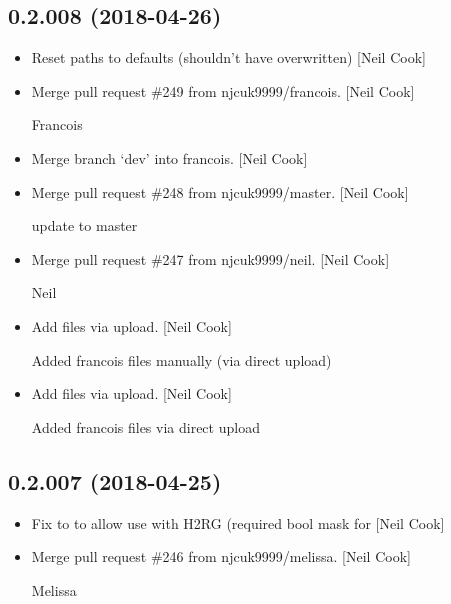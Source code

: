 \documentclass[a4paper,10pt,english]{report}
\begin{document}
\subsection{0.2.008 (2018-04-26)}
\label{\detokenize{misc/changelog:id453}}\begin{itemize}
\item {} 
Reset paths to defaults (shouldn’t have overwritten) {[}Neil Cook{]}

\item {} 
Merge pull request \#249 from njcuk9999/francois. {[}Neil Cook{]}

Francois

\item {} 
Merge branch ‘dev’ into francois. {[}Neil Cook{]}

\item {} 
Merge pull request \#248 from njcuk9999/master. {[}Neil Cook{]}

update to master

\item {} 
Merge pull request \#247 from njcuk9999/neil. {[}Neil Cook{]}

Neil

\item {} 
Add files via upload. {[}Neil Cook{]}

Added francois files manually (via direct upload)

\item {} 
Add files via upload. {[}Neil Cook{]}

Added francois files via direct upload

\end{itemize}


\subsection{0.2.007 (2018-04-25)}
\label{\detokenize{misc/changelog:id454}}\begin{itemize}
\item {} 
Fix to  to allow use with H2RG (required bool mask for
 {[}Neil Cook{]}

\item {} 
Merge pull request \#246 from njcuk9999/melissa. {[}Neil Cook{]}

Melissa

\end{itemize}
\end{document}
